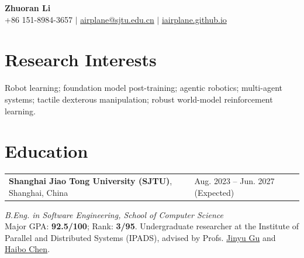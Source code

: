 \documentclass[a4paper,11pt]{article}
\makeatletter
\newcommand{\datedline}[2]{%
  \begin{tabularx}{\textwidth}{@{}>{\raggedright\arraybackslash}X>{\raggedleft\arraybackslash}p{0.34\textwidth}@{}}
    #1 & #2
  \end{tabularx}%
}
\newcommand{\advisor}[2]{\href{#1}{#2}}
\makeatother
\begin{document}
\begin{center}
  {\LARGE\bfseries Zhuoran Li}\\[3pt]
  \small
  +86 151-8984-3657
  \quad $\vert$ \quad
  \href{mailto:airplane@sjtu.edu.cn}{airplane@sjtu.edu.cn}
  \quad $\vert$ \quad
  \href{https://iairplane.github.io/}{iairplane.github.io}
\end{center}
\vspace{-7pt}

\section{Research Interests}
Robot learning; foundation model post-training; agentic robotics; multi-agent systems; tactile dexterous
manipulation; robust world-model reinforcement learning.

\section{Education}
\datedline{\textbf{Shanghai Jiao Tong University (SJTU)}, Shanghai, China}{Aug. 2023 -- Jun. 2027 (Expected)}
\textit{B.Eng. in Software Engineering, School of Computer Science}\\[1pt]
Major GPA: \textbf{92.5/100}; Rank: \textbf{3/95}. Undergraduate researcher at the Institute of Parallel and
Distributed Systems (IPADS), advised by Profs. \advisor{https://ipads.sjtu.edu.cn/pub/members/jinyu_gu}{Jinyu Gu} and \advisor{https://ipads.sjtu.edu.cn/pub/members/haibo_chen}{Haibo Chen}.
\end{document}
